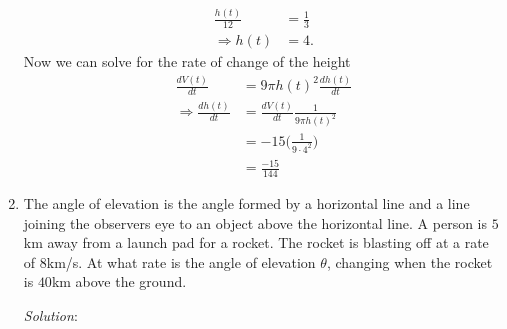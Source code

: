 \documentclass[12pt]{article}
\theoremstyle{remark}
\begin{document}
\begin{enumerate}
\begin{mdframed}[style=TheoremFrame]
\begin{align*}
\frac{h(t)}{12} &= \frac{1}{3}\\
\Rightarrow h(t) &= 4. 
\end{align*}
Now we can solve for the rate of change of the height
\begin{align*}
\frac{dV(t)}{dt}&= 9\pi h(t)^2 \frac{dh(t)}{dt}\\
\Rightarrow \frac{dh(t)}{dt} &= \frac{dV(t)}{dt} \frac{1}{9\pi h(t)^2}\\
&= -15 \bigg(\frac{1}{9\cdot4^2}\bigg)\\
&= \frac{-15}{144}
\end{align*}
\end{mdframed}
\item The angle of elevation is the angle formed by a horizontal line and a line joining the observers eye to an object above the horizontal line. A person is $5$km away from a launch pad for a rocket. The rocket is blasting off at a rate of $8$km/s. At what rate is the angle of elevation $\theta$, changing when the rocket is $40$km above the ground.
\begin{mdframed}[style=TheoremFrame]
\textit{Solution}:\\


\end{mdframed}
\end{enumerate}
\end{document}
